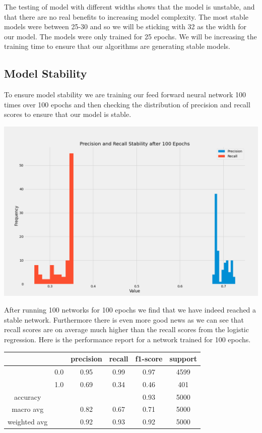 \documentclass[12pt]{article}
\begin{document}
	The testing of model with different widths shows that the model is unstable, and that there are no real benefits to increasing model complexity. The most stable models were between 25-30 and so we will be sticking with 32 as the width for our model. The models were only trained for 25 epochs. We will be increasing the training time to ensure that our algorithms are generating stable models. 
	
	\subsection{Model Stability}
	
	To ensure model stability we are training our feed forward neural network 100 times over 100 epochs and then checking the distribution of precision and recall scores to ensure that our model is stable. 
		
	\begin{center}
 		\includegraphics[scale=0.4]{../notebooks/StableNetwork.png}
	\end{center}
	
	After running 100 networks for 100 epochs we find that we have indeed reached a stable network. Furthermore there is even more good news as we can see that recall scores are on average much higher than the recall scores from the logistic regression. Here is the performance report for a network trained for 100 epochs. 
	
	\begin{tabular}{c|c|c|c|c|c}
		\hline
		& 		& 	precision &  recall  & f1-score   & support \\ \hline
		
		&  0.0	&		0.95 &     0.99   &  0.97   &  4599 \\ \hline
		&  1.0  &		0.69 &     0.34   &  0.46   &   401 \\ \hline
		
		accuracy    & & & &                       		  0.93   &   5000 \\ \hline
		macro avg   & &   			0.82   &   0.67  &    0.71   &   5000  \\ \hline
		weighted avg  & &   		0.92   &   0.93  &    0.92   &   5000 \\ \hline
	\end{tabular}
\end{document}
